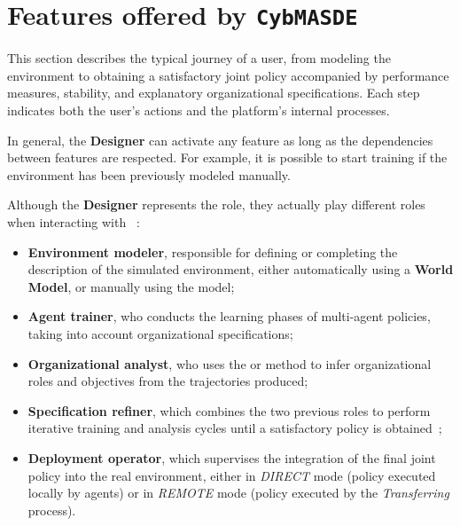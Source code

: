 \section{Features offered by \texttt{CybMASDE}}

This section describes the typical journey of a  user, from modeling the environment to obtaining a satisfactory joint policy accompanied by performance measures, stability, and explanatory organizational specifications. Each step indicates both the user's actions and the platform's internal processes.

In general, the \textbf{Designer} can activate any feature as long as the dependencies between features are respected.
For example, it is possible to start training if the environment has been previously modeled manually.


Although the \textbf{Designer} represents the  role, they actually play different roles when interacting with ~:
\begin{itemize}
  \item \textbf{Environment modeler}, responsible for defining or completing the description of the simulated environment, either automatically using a \textbf{World Model}, or manually using the  model;
  \item \textbf{Agent trainer}, who conducts the learning phases of multi-agent policies, taking into account organizational specifications;
  \item \textbf{Organizational analyst}, who uses the  or  method to infer organizational roles and objectives from the trajectories produced;
  \item \textbf{Specification refiner}, which combines the two previous roles to perform iterative training and analysis cycles until a satisfactory policy is obtained~;
  \item \textbf{Deployment operator}, which supervises the integration of the final joint policy into the real environment, either in \textit{DIRECT} mode (policy executed locally by agents) or in \textit{REMOTE} mode (policy executed by the \textit{Transferring} process).
\end{itemize}

